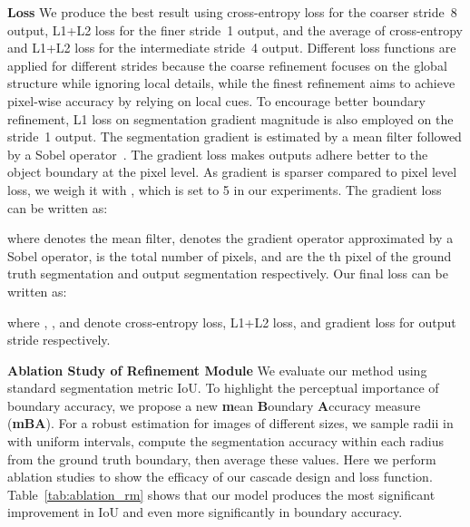 \documentclass[10pt,twocolumn,letterpaper]{article}
\begin{document}
\noindent \textbf{Loss} \space \space
We produce the best result using cross-entropy loss for the coarser stride~8 output, L1+L2 loss for the finer stride~1 output, and the average of cross-entropy and L1+L2 loss for the intermediate stride~4 output. 
Different loss functions are applied for different strides because the coarse refinement focuses on the global structure while ignoring local details, while the finest refinement aims to achieve pixel-wise accuracy by relying on local cues.
To encourage better boundary refinement, L1 loss on segmentation gradient magnitude is also employed on the stride~1 output. The segmentation gradient is estimated by a  mean filter followed by a Sobel operator~\cite{kanopoulos1988design}. The gradient loss makes outputs adhere better to the object boundary at the pixel level. As gradient is sparser compared to pixel level loss, we weigh it with , which is set to 5 in our experiments. The gradient loss can be written as:

where  denotes the  mean filter,  denotes the gradient operator approximated by a Sobel operator,  is the total number of pixels,  and  are the th pixel of the ground truth segmentation and output segmentation respectively. Our final loss can be written as:

where , , and  denote cross-entropy loss, L1+L2 loss, and gradient loss for output stride  respectively. 

\noindent \textbf{Ablation Study of Refinement Module} \space \space
We evaluate our method using standard segmentation metric IoU. To highlight the perceptual importance of boundary accuracy, we propose a new \textbf{m}ean \textbf{B}oundary \textbf{A}ccuracy measure (\textbf{mBA}). 
For a robust estimation for images of different sizes, we sample  radii in  with uniform intervals, compute the segmentation accuracy within each radius from the ground truth boundary, then average these values.
Here we perform ablation studies to show the efficacy of our cascade design and loss function. Table~\ref{tab:ablation_rm} shows that our model produces the most significant improvement in IoU and even more significantly in boundary accuracy.
\end{document}
